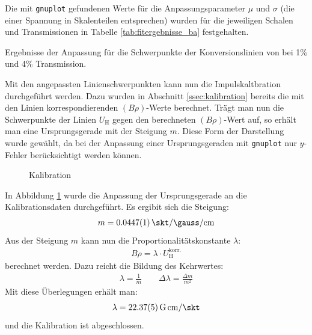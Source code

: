\documentclass[11pt, a4paper]{article}
\numberwithin{equation}{section}
\begin{document}
Die mit \texttt{gnuplot} gefundenen Werte für die Anpassungsparameter $\mu$ und $\sigma$ (die einer Spannung in Skalenteilen entsprechen) wurden für die jeweiligen Schalen und Transmissionen in Tabelle \ref{tab:fitergebnisse_ba} festgehalten.
\begin{table}[h]
	\centering
	
	\caption{Ergebnisse der Anpassung für die Schwerpunkte der Konversionslinien von  bei 1\% und 4\% Transmission.}
	\label{tab:fitergebnisse_ba}
\end{table}
Mit den angepassten Linienschwerpunkten kann nun die Impulskaltbration durchgeführt werden.
Dazu wurden in Abschnitt \ref{ssec:kalibration} bereits die mit den Linien korrespondierenden $(B \rho)$-Werte berechnet.
Trägt man nun die Schwerpunkte der Linien $U_\mathrm{H}$ gegen den berechneten $(B \rho)$-Wert auf, so erhält man eine Ursprungsgerade mit der Steigung $m$.
Diese Form der Darstellung wurde gewählt, da bei der Anpassung einer Ursprungsgeraden mit \texttt{gnuplot} nur $y$-Fehler berücksichtigt werden können.
\begin{figure}[h]
	\centering
	
	\caption{Kalibration}
	\label{fig:kalibration}
\end{figure}
In Abbildung \ref{fig:kalibration} wurde die Anpassung der Ursprungsgerade  an die Kalibrationsdaten durchgeführt.
Es ergibit sich die Steigung:
\begin{align}
	m = \SI{0.0447 +- 0.0001}{\skt\per \gauss \per \centi\metre}
\end{align}
Aus der Steigung $m$ kann nun die Proportionalitätskonstante $\lambda$:
\begin{align}
	B \rho = \lambda \cdot U_\mathrm{H}^\mathrm{korr.}
\end{align}
berechnet werden.
Dazu reicht die Bildung des Kehrwertes:
\begin{align}
	\lambda = \frac{1}{m} \qquad \Delta \lambda = \frac{\Delta m}{m^2}
\end{align}
Mit diese Überlegungen erhält man:
\begin{align}
	\lambda = \SI{22.37 +- 0.05}{G.cm\per\skt}
\end{align}
und die Kalibration ist abgeschlossen.
\end{document}

